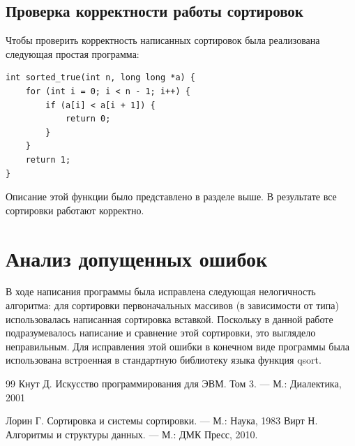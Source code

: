 \documentclass[a4paper,12pt,titlepage,finall]{article}
\begin{document}
\subsection{Проверка корректности работы сортировок}

Чтобы проверить корректность написанных сортировок была реализована следующая простая программа:

\begin{verbatim}
int sorted_true(int n, long long *a) {
    for (int i = 0; i < n - 1; i++) {
        if (a[i] < a[i + 1]) {
            return 0;
        }
    }
    return 1;
}
\end{verbatim}

Описание этой функции было представлено в разделе выше. В результате все сортировки работают корректно.





\newpage

\section{Анализ допущенных ошибок}

В ходе написания программы была исправлена следующая нелогичность алгоритма: для сортировки первоначальных массивов (в зависимости от типа) использовалась написанная сортировка вставкой. Поскольку в данной работе подразумевалось написание и сравнение этой сортировки, это выглядело неправильным. Для исправления этой ошибки в конечном виде программы была использована встроенная в стандартную библиотеку языка функция qsort.


\newpage
\begin{raggedright}
\begin{thebibliography}{99}
 Кнут Д. Искусство программирования для ЭВМ. Том 3. — М.: Диалектика, 2001
    
 Лорин Г. Сортировка и системы сортировки. — М.: Наука, 1983
 Вирт Н. Алгоритмы и структуры данных. — М.: ДМК Пресс, 2010. 

\end{thebibliography}
\end{raggedright}
\end{document}
